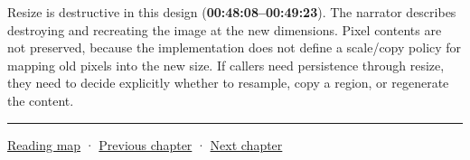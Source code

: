 Resize is destructive in this design (\textbf{00:48:08--00:49:23}). The narrator describes destroying and recreating the image at the new dimensions. Pixel contents are not preserved, because the implementation does not define a scale/copy policy for mapping old pixels into the new size. If callers need persistence through resize, they need to decide explicitly whether to resample, copy a region, or regenerate the content.

\begin{center}\rule{0.5\linewidth}{0.5pt}\end{center}

\hyperref[volume-reading-map]{Reading map} · \hyperref[06-engine-ii-ch025-renderer-evolution-through-resource-ownership]{Previous chapter} · \hyperref[06-engine-ii-ch027-preparing-and-publishing-runtime-content]{Next chapter}

